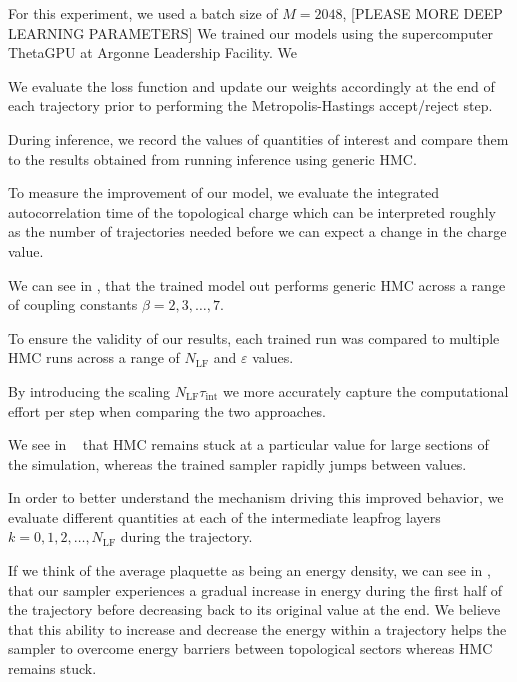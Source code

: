 \documentclass{article} %
\begin{document}
For this experiment, we used a batch size of $M=2048$, [PLEASE MORE DEEP LEARNING PARAMETERS]
We trained our models using the supercomputer ThetaGPU at Argonne Leadership Facility.  We 
%

We evaluate the loss function and update our weights accordingly at the end of each trajectory prior to performing the Metropolis-Hastings accept/reject step.
%

During inference, we record the values of quantities of interest and compare them to the results obtained from running inference using generic HMC.
%

To measure the improvement of our model, we evaluate the integrated autocorrelation time of the topological charge which can be interpreted roughly as the number of trajectories needed before we can expect a change in the charge value.
%

We can see in , that the trained model out performs generic HMC across a range of coupling constants \(\beta = 2, 3, \ldots, 7\).
%

To ensure the validity of our results, each trained run was compared to multiple HMC runs across a range of \(N_{\mathrm{LF}}\) and \(\varepsilon\) values.
%

By introducing the scaling \(N_{\mathrm{LF}} \tau_{\mathrm{int}}\) we more accurately capture the computational effort per step when comparing the two approaches.
%

We see in ~ that HMC remains stuck at a particular value for large sections of the simulation, whereas the trained sampler rapidly jumps between values.
%

In order to better understand the mechanism driving this improved behavior, we evaluate different quantities at each of the intermediate leapfrog layers \(k=0, 1, 2, \ldots, N_{\mathrm{LF}}\) during the trajectory.
%

If we think of the average plaquette as being an energy density, we can see in ,  that our sampler experiences a gradual increase in energy during the first half of the trajectory before decreasing back to its original value at the end.
%
We believe that this ability to increase and decrease the energy within a trajectory helps the sampler to overcome energy barriers between topological sectors whereas HMC remains stuck.
%
\end{document}
